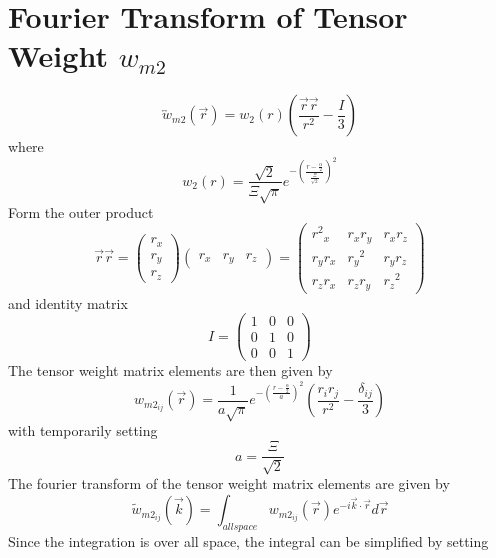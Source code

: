 \documentclass[double,12pt]{beavtex}
\begin{document}
\section{Fourier Transform of Tensor Weight $w_{m2}$}
\begin{equation}{\overleftrightarrow{w}_{m2}(\vec{r})=w_2(r)\left(\frac{\vec{r}\vec{r}}{r^2}-\frac{I}{3}\right)}\end{equation}
where
\begin{equation}{w_2(r)=\frac{\sqrt{2}}{\Xi\sqrt{\pi}}e^{-\left(\frac{r-\frac{\alpha}{2}}{\frac{\Xi}{\sqrt{2}}}\right)^2}}\end{equation}
Form the outer product
\begin{equation}{\vec{r}\vec{r}=\left(\begin{array}{c} r_x \\ r_y \\ r_z \end{array} \right) \left(\begin{array}{rrr} r_x & r_y & r_z \end{array} \right)=\left(\begin{array}{ccc} {r^2}_x & r_xr_y & r_xr_z \\ r_yr_x & {r_y}^2 & r_yr_z \\ r_zr_x & r_zr_y & {r_z}^2 \end{array}\right)}\end{equation}
and identity matrix
\begin{equation}{I=\left(\begin{array}{ccc} 1 & 0 & 0 \\ 0 & 1 & 0 \\ 0 & 0 & 1 \end{array}\right)}\end{equation}
The tensor weight matrix elements are then given by
\begin{equation}{w_{m2_{ij}}(\vec{r})=\frac{1}{a\sqrt{\pi}}e^{-\left(\frac{r-\frac{\alpha}{2}}{a}\right)^2}\left(\frac{r_ir_j}{r^2}-\frac{\delta_{ij}}{3}\right)}\end{equation}
with temporarily setting
\begin{equation}{a=\frac{\Xi}{\sqrt{2}}}\end{equation}
The fourier transform of the tensor weight matrix elements are given by
\begin{equation}{\widetilde{w}_{m2_{ij}}(\vec{k})=\int_{allspace}{w_{{m2}_{ij}}}(\vec{r})e^{-i\vec{k}\cdot\vec{r}}d{\vec{r}}}\end{equation}
Since the integration is over all space, the integral can be simplified by setting 
\end{document}
